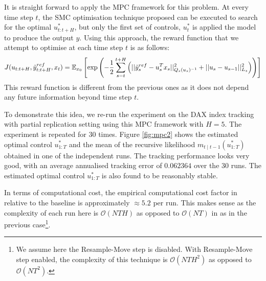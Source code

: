 It is straight forward to apply the MPC framework for this problem. At every time step $t$, the SMC optimisation technique proposed can be executed to search for the optimal $u^*_{t:t+H}$, but only the first set of controls, $u^*_t$ is applied the model to produce the output $y$. Using this approach, the reward function that we attempt to optimise at each time step $t$ is as follows:
\begin{equation}
  J(u_{t:t+H},\tilde{y}^{ref}_{t:t+H}, x_t) = \operatorname{\mathbb{E}}_{x_0}\left[ \exp \left( -\dfrac{1}{2}\displaystyle\sum^{t+H}_{s=t}\left(\vert\vert \tilde{y}^{ref}_s - u^T_s x_s \vert\vert^2_{Q_s(u_s)^{-1}}  + \vert\vert u_s - u_{s-1} \vert\vert^2_{L_s}\right) \right ) \right]
\label{eq:J2}
\end{equation}
This reward function is different from the previous ones as it does not depend any future information beyond time step $t$.

To demonstrate this idea, we re-run the experiment on the DAX index tracking with partial replication setting using this MPC framework with $H=5$. The experiment is repeated for $30$ times. Figure \ref{fig:mpc2} shows the estimated optimal control $u^*_{1:T}$ and the mean of the recursive likelihood $m_{t \mid t-1}(u^*_{1:T})$ obtained in one of the independent runs. The tracking performance looks very good, with an average annualised tracking error of $0.062364$ over the $30$ runs. The estimated optimal control $u^*_{1:T}$ is also found to be reasonably stable.

In terms of computational cost, the empirical computational cost factor in relative to the baseline is approximately $\approx 5.2$ per run. This makes sense as the complexity of each run here is  $\mathcal{O}(NTH)$ as opposed to $\mathcal{O}(NT)$ in as in the previous case\footnote{We assume here the Resample-Move step is disabled. With Resample-Move step enabled, the complexity of this technique is $\mathcal{O}(NTH^2)$ as opposed to $\mathcal{O}(NT^2)$.}.

